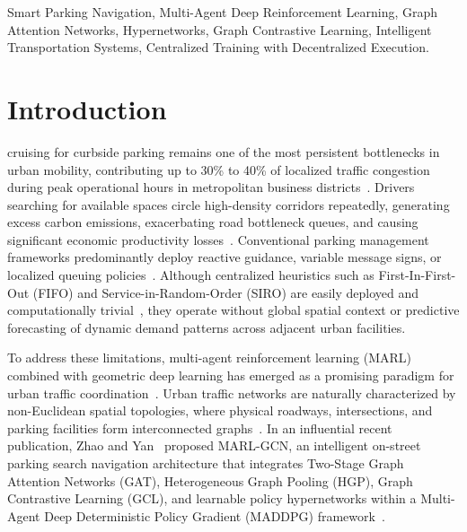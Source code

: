 \documentclass[journal]{IEEEtran}
\begin{document}
\begin{abstract}
attention (No-GAT) descriptively reduced delay by 23.0\%, indicating optimization overhead on compact topologies under exploratory training horizons. Edge latency profiling on modern CPU architecture demonstrates an amortized per-agent decision latency of $17.61~\mu$s and a joint 9-agent policy forward latency of $158.52 \pm 5.76~\mu$s, verifying real-time embedded viability. Finally, we document the software adaptation connecting this municipal research architecture to an operational 5-stall IoT campus deployment governed by Firebase Realtime Database ETag conditional concurrency safeguards.
\end{abstract}

\begin{IEEEkeywords}
Smart Parking Navigation, Multi-Agent Deep Reinforcement Learning, Graph Attention Networks, Hypernetworks, Graph Contrastive Learning, Intelligent Transportation Systems, Centralized Training with Decentralized Execution.
\end{IEEEkeywords}

\section{Introduction}
 cruising for curbside parking remains one of the most persistent bottlenecks in urban mobility, contributing up to 30\% to 40\% of localized traffic congestion during peak operational hours in metropolitan business districts~\cite{shoup2005high,arnott2006economic}. Drivers searching for available spaces circle high-density corridors repeatedly, generating excess carbon emissions, exacerbating road bottleneck queues, and causing significant economic productivity losses~\cite{lin2017survey,inci2015review}. Conventional parking management frameworks predominantly deploy reactive guidance, variable message signs, or localized queuing policies~\cite{vlahogianni2016real,zheng2015parking,geng2013new}. Although centralized heuristics such as First-In-First-Out (FIFO) and Service-in-Random-Order (SIRO) are easily deployed and computationally trivial~\cite{larson2007urban,larson2010congestion}, they operate without global spatial context or predictive forecasting of dynamic demand patterns across adjacent urban facilities.

To address these limitations, multi-agent reinforcement learning (MARL) combined with geometric deep learning has emerged as a promising paradigm for urban traffic coordination~\cite{kiran2022deep,zhang2021multi}. Urban traffic networks are naturally characterized by non-Euclidean spatial topologies, where physical roadways, intersections, and parking facilities form interconnected graphs~\cite{kipf2017semi,velickovic2018graph,li2018diffusion,yu2018spatio}. In an influential recent publication, Zhao and Yan~\cite{zhao2025deep} proposed MARL-GCN, an intelligent on-street parking search navigation architecture that integrates Two-Stage Graph Attention Networks (GAT), Heterogeneous Graph Pooling (HGP), Graph Contrastive Learning (GCL), and learnable policy hypernetworks within a Multi-Agent Deep Deterministic Policy Gradient (MADDPG) framework~\cite{lowe2017multi}. 
\end{document}
